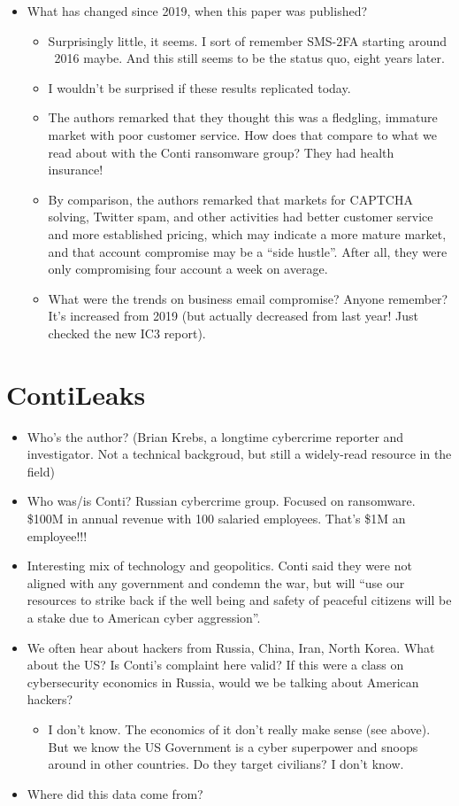 \documentclass[11pt]{article}
\begin{document}
\begin{itemize}
\begin{itemize}
    \end{itemize}
    \item What has changed since 2019, when this paper was published?
    \begin{itemize}
        \item Surprisingly little, it seems. I sort of remember SMS-2FA starting around ~2016 maybe. And this still seems to be the status quo, eight years later. 
        \item I wouldn't be surprised if these results replicated today. 
        \item The authors remarked that they thought this was a fledgling, immature market with poor customer service. How does that compare to what we read about with the Conti ransomware group? They had health insurance!
        \item By comparison, the authors remarked that markets for CAPTCHA solving, Twitter spam, and other activities had better customer service and more established pricing, which may indicate a more mature market, and that account compromise may be a ``side hustle''. After all, they were only compromising four account a week on average. 
        \item What were the trends on business email compromise? Anyone remember? It's increased from 2019 (but actually decreased from last year! Just checked the new IC3 report).
    \end{itemize}
\end{itemize}

\section{ContiLeaks}

\begin{itemize}
    \item Who's the author? (Brian Krebs, a longtime cybercrime reporter and investigator. Not a technical backgroud, but still a widely-read resource in the field)
    \item Who was/is Conti? Russian cybercrime group. Focused on ransomware. \$100M in annual revenue with 100 salaried employees. That's \$1M an employee!!!
    \item Interesting mix of technology and geopolitics. Conti said they were not aligned with any government and condemn the war, but will ``use our resources to strike back if the well being and safety of peaceful citizens will be a stake due to American cyber aggression''.
    \item We often hear about hackers from Russia, China, Iran, North Korea. What about the US? Is Conti's complaint here valid? If this were a class on cybersecurity economics in Russia, would we be talking about American hackers?
    \begin{itemize}
        \item I don't know. The economics of it don't really make sense (see above). But we know the US Government is a cyber superpower and snoops around in other countries. Do they target civilians? I don't know.
    \end{itemize}
    \item Where did this data come from?
\end{itemize}
\end{document}
